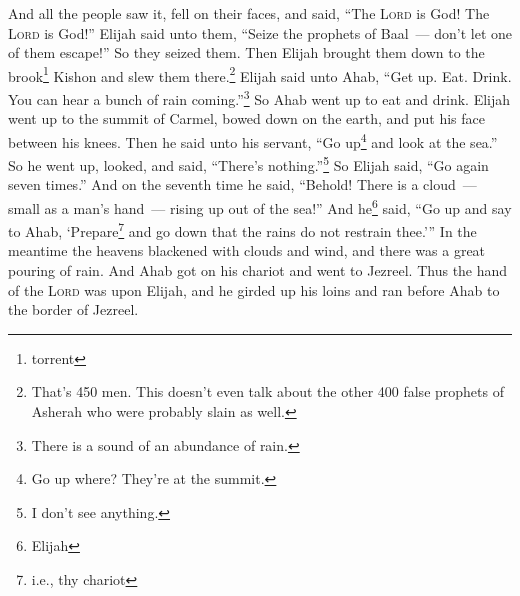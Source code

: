 \begin{inparaenum}
     And all the people saw it, fell on their faces, and said, ``The \textsc{Lord} is God! The \textsc{Lord} is God!''%
     Elijah said unto them, ``Seize the prophets of Baal~--- don't let one of them escape!'' So they seized them. Then Elijah brought them down to the brook\footnote{torrent} Kishon and slew them there.\footnote{That's 450 men. This doesn't even talk about the other 400 false prophets of Asherah who were probably slain as well.}%
     Elijah said unto Ahab, ``Get up. Eat. Drink. You can hear a bunch of rain coming.''\footnote{There is a sound of an abundance of rain.}%
     So Ahab went up to eat and drink. Elijah went up to the summit of Carmel, bowed down on the earth, and put his face between his knees.%
     Then he said unto his servant, ``Go up\footnote{Go up where? They're at the summit.} and look at the sea.'' So he went up, looked, and said, ``There's nothing.''\footnote{I don't see anything.} So Elijah said, ``Go again seven times.''%
     And on the seventh time he said, ``Behold! There is a cloud~--- small as a man's hand~--- rising up out of the sea!'' And he\footnote{Elijah} said, ``Go up and say to Ahab, `Prepare\footnote{i.e., thy chariot} and go down that the rains do not restrain thee.'''%
     In the meantime the heavens blackened with clouds and wind, and there was a great pouring of rain. And Ahab got on his chariot and went to Jezreel.%
     Thus the hand of the \textsc{Lord} was upon Elijah, and he girded up his loins and ran before Ahab to the border of Jezreel.%
\end{inparaenum}
